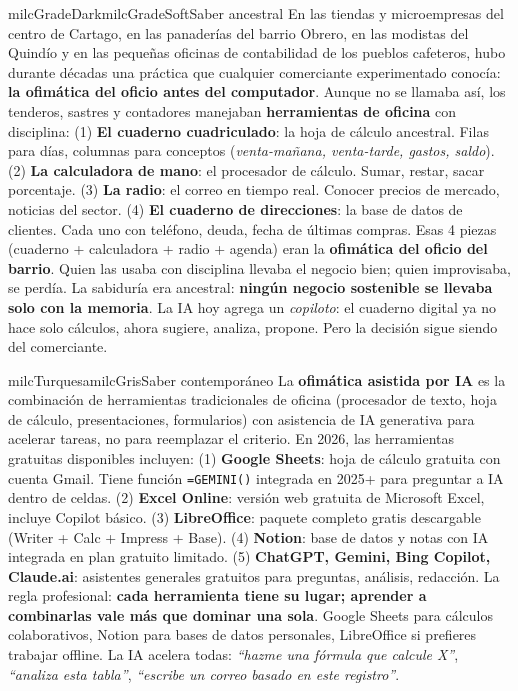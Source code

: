\documentclass[11pt,letterpaper]{article}
\begin{document}
\begin{softbox}{milcGradeDark}{milcGradeSoft}{Saber ancestral}
En las tiendas y microempresas del centro de Cartago, en las panaderías del barrio Obrero, en las modistas del Quindío y en las pequeñas oficinas de contabilidad de los pueblos cafeteros, hubo durante décadas una práctica que cualquier comerciante experimentado conocía: \textbf{la ofimática del oficio antes del computador}. Aunque no se llamaba así, los tenderos, sastres y contadores manejaban \textbf{herramientas de oficina} con disciplina: (1) \textbf{El cuaderno cuadriculado}: la hoja de cálculo ancestral. Filas para días, columnas para conceptos (\emph{venta-mañana, venta-tarde, gastos, saldo}). (2) \textbf{La calculadora de mano}: el procesador de cálculo. Sumar, restar, sacar porcentaje. (3) \textbf{La radio}: el correo en tiempo real. Conocer precios de mercado, noticias del sector. (4) \textbf{El cuaderno de direcciones}: la base de datos de clientes. Cada uno con teléfono, deuda, fecha de últimas compras. Esas 4 piezas (cuaderno + calculadora + radio + agenda) eran la \textbf{ofimática del oficio del barrio}. Quien las usaba con disciplina llevaba el negocio bien; quien improvisaba, se perdía. La sabiduría era ancestral: \textbf{ningún negocio sostenible se llevaba solo con la memoria}. La IA hoy agrega un \emph{copiloto}: el cuaderno digital ya no hace solo cálculos, ahora sugiere, analiza, propone. Pero la decisión sigue siendo del comerciante.
\end{softbox}

\begin{softbox}{milcTurquesa}{milcGris}{Saber contemporáneo}
La \textbf{ofimática asistida por IA} es la combinación de herramientas tradicionales de oficina (procesador de texto, hoja de cálculo, presentaciones, formularios) con asistencia de IA generativa para acelerar tareas, no para reemplazar el criterio. En 2026, las herramientas gratuitas disponibles incluyen: (1) \textbf{Google Sheets}: hoja de cálculo gratuita con cuenta Gmail. Tiene función \texttt{=GEMINI()} integrada en 2025+ para preguntar a IA dentro de celdas. (2) \textbf{Excel Online}: versión web gratuita de Microsoft Excel, incluye Copilot básico. (3) \textbf{LibreOffice}: paquete completo gratis descargable (Writer + Calc + Impress + Base). (4) \textbf{Notion}: base de datos y notas con IA integrada en plan gratuito limitado. (5) \textbf{ChatGPT, Gemini, Bing Copilot, Claude.ai}: asistentes generales gratuitos para preguntas, análisis, redacción. La regla profesional: \textbf{cada herramienta tiene su lugar; aprender a combinarlas vale más que dominar una sola}. Google Sheets para cálculos colaborativos, Notion para bases de datos personales, LibreOffice si prefieres trabajar offline. La IA acelera todas: \emph{``hazme una fórmula que calcule X''}, \emph{``analiza esta tabla''}, \emph{``escribe un correo basado en este registro''}.
\end{softbox}
\end{document}
